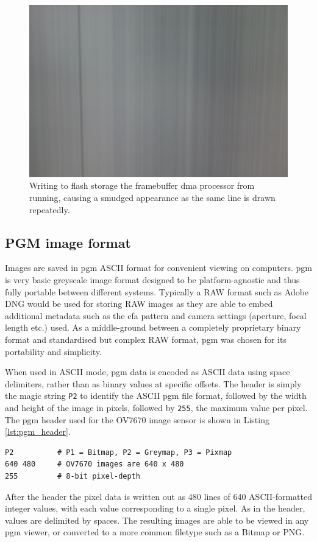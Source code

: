 
\begin{figure}
  \centering
  \includegraphics[width=1\textwidth]{./img/interrupt_smudge.jpg}
  \caption{Writing to flash storage the framebuffer \gls{dma} processor from running, causing a smudged appearance as the same line is drawn repeatedly.}
  \label{fig:interrupt_smudge}
\end{figure}

\subsection{PGM image format}
Images are saved in \gls{pgm} ASCII format for convenient viewing on computers. \gls{pgm} is very basic greyscale image format designed to be platform-agnostic and thus fully portable between different systems. Typically a RAW format such as Adobe DNG would be used for storing RAW images as they are able to embed additional metadata such as the \gls{cfa} pattern and camera settings (aperture, focal length etc.) used. As a middle-ground between a completely proprietary binary format and standardised but complex RAW format, \gls{pgm} was chosen for its portability and simplicity.

When used in ASCII mode, \gls{pgm} data is encoded as ASCII data using space delimiters, rather than as binary values at specific offsets. The header is simply the magic string \texttt{P2} to identify the ASCII \gls{pgm} file format, followed by the width and height of the image in pixels, followed by \texttt{255}, the maximum value per pixel. The \gls{pgm} header used for the OV7670 image sensor is shown in Listing \ref{lst:pgm_header}.

\begin{lstlisting}[caption={\gls{pgm} file header.}, label={lst:pgm_header}]
P2          # P1 = Bitmap, P2 = Greymap, P3 = Pixmap
640 480     # OV7670 images are 640 x 480
255         # 8-bit pixel-depth
\end{lstlisting}

After the header the pixel data is written out as 480 lines of 640 ASCII-formatted integer values, with each value corresponding to a single pixel. As in the header, values are delimited by spaces. The resulting images are able to be viewed in any \gls{pgm} viewer, or converted to a more common filetype such as a Bitmap or PNG.
